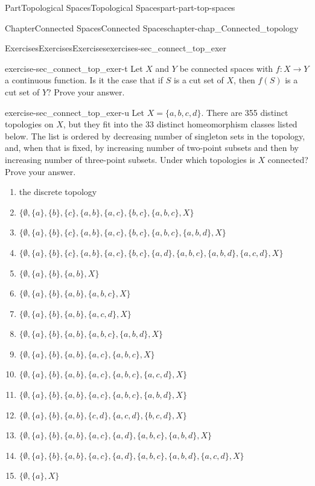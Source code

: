 \documentclass[oneside,10pt,]{book}
\numberwithin{equation}{chapter}
\begin{document}
\begin{partptx}{Part}{Topological Spaces}{}{Topological Spaces}{}{}{part-part-top-spaces}
\begin{chapterptx}{Chapter}{Connected Spaces}{}{Connected Spaces}{}{}{chapter-chap_Connected_topology}
\begin{exercises-section}{Exercises}{Exercises}{}{Exercises}{}{}{exercises-sec_connect_top_exer}
\begin{divisionexercise}{20}{}{}{exercise-sec_connect_top_exer-t}
Let \(X\) and \(Y\) be connected spaces with \(f : X \to Y\) a continuous function. Is it the case that if \(S\) is a cut set of \(X\), then \(f(S)\) is a cut set of \(Y\)? Prove your answer.%
\end{divisionexercise}%
\begin{divisionexercise}{21}{}{}{exercise-sec_connect_top_exer-u}%
Let \(X = \{a,b,c,d\}\). There are 355 distinct topologies on \(X\), but they fit into the 33 distinct homeomorphism classes listed below. The list is ordered by decreasing number of singleton sets in the topology, and, when that is fixed, by increasing number of two-point subsets and then by increasing number of three-point subsets. Under which topologies is \(X\) connected? Prove your answer.%
\begin{enumerate}[font=\bfseries,label=(\alph*),ref=\alph*]%
\item{}the discrete topology%
\item{}\(\{\emptyset, \{a\}, \{b\}, \{c\}, \{a,b\}, \{a,c\}, \{b,c\}, \{a,b,c\}, X\}\)%
\item{}\(\{\emptyset, \{a\}, \{b\}, \{c\}, \{a,b\}, \{a,c\}, \{b,c\}, \{a,b,c\}, \{a,b,d\}, X\}\)%
\item{}\(\{\emptyset, \{a\}, \{b\}, \{c\}, \{a,b\}, \{a,c\}, \{b,c\}, \{a,d\}, \{a,b,c\}, \{a,b,d\}, \{a,c,d\}, X\}\)%
\item{}\(\{\emptyset, \{a\}, \{b\}, \{a,b\}, X\}\)%
\item{}\(\{\emptyset, \{a\}, \{b\}, \{a,b\}, \{a,b,c\}, X\}\)%
\item{}\(\{\emptyset, \{a\}, \{b\}, \{a,b\}, \{a,c,d\}, X\}\)%
\item{}\(\{\emptyset, \{a\}, \{b\}, \{a,b\}, \{a,b,c\}, \{a,b,d\}, X\}\)%
\item{}\(\{\emptyset, \{a\}, \{b\}, \{a,b\}, \{a,c\}, \{a,b,c\}, X\}\)%
\item{}\(\{\emptyset, \{a\}, \{b\}, \{a,b\}, \{a,c\}, \{a,b,c\}, \{a,c,d\}, X\}\)%
\item{}\(\{\emptyset, \{a\}, \{b\}, \{a,b\}, \{a,c\}, \{a,b,c\}, \{a,b,d\}, X\}\)%
\item{}\(\{\emptyset, \{a\}, \{b\}, \{a,b\}, \{c,d\}, \{a,c,d\}, \{b,c,d\}, X\}\)%
\item{}\(\{\emptyset, \{a\}, \{b\}, \{a,b\}, \{a,c\}, \{a,d\}, \{a,b,c\}, \{a,b,d\}, X\}\)%
\item{}\(\{\emptyset, \{a\}, \{b\}, \{a,b\}, \{a,c\}, \{a,d\}, \{a,b,c\}, \{a,b,d\}, \{a,c,d\}, X\}\)%
\item{}\(\{\emptyset, \{a\}, X\}\)%

\end{enumerate}
\end{divisionexercise}
\end{exercises-section}
\end{chapterptx}
\end{partptx}
\end{document}
